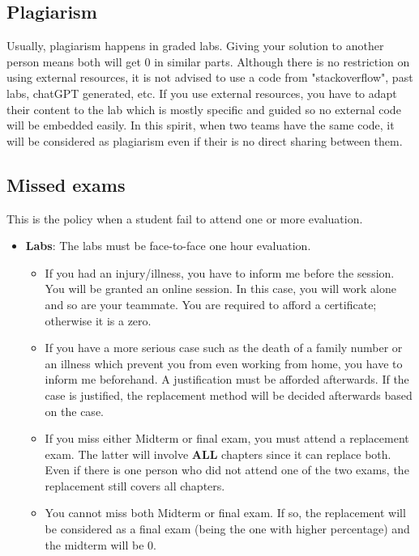 \documentclass[11pt, a4paper]{article}
\begin{document}
\subsection{Plagiarism}

Usually, plagiarism happens in graded labs. 
Giving your solution to another person means both will get 0 in similar parts. 
Although there is no restriction on using external resources, it is not advised to use a code from "stackoverflow", past labs, chatGPT generated, etc. 
If you use external resources, you have to adapt their content to the lab which is mostly specific and guided so no external code will be embedded easily. 
In this spirit, when two teams have the same code, it will be considered as plagiarism even if their is no direct sharing between them. 

\subsection{Missed exams}

This is the policy when a student fail to attend one or more evaluation.
\begin{itemize}
	\item \textbf{Labs}: The labs must be face-to-face one hour evaluation. 
	\begin{itemize}
		\item If you had an injury/illness, you have to inform me before the session. You will be granted an online session. In this case, you will work alone and so are your teammate. You are required to afford a certificate; otherwise it is a zero.
		\item If you have a more serious case such as the death of a family number or an illness which prevent you from even working from home, you have to inform me beforehand. A justification must be afforded afterwards. If the case is justified, the replacement method will be decided afterwards based on the case.
		\item If you miss either Midterm or final exam, you must attend a replacement exam. The latter will involve \textbf{ALL} chapters since it can replace both. 
		Even if there is one person who did not attend one of the two exams, the replacement still covers all chapters.
		\item You cannot miss both Midterm or final exam. If so, the replacement will be considered as a final exam (being the one with higher percentage) and the midterm will be 0.
	\end{itemize}
\end{itemize}
\end{document}

